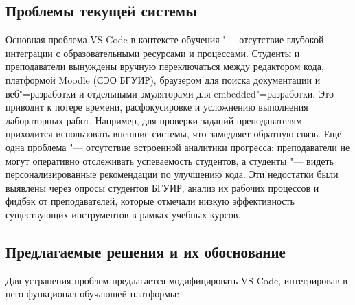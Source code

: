\documentclass{bsuir}
\begin{document}
\subsection{Проблемы текущей системы}

Основная проблема VS Code в контексте обучения "--- отсутствие глубокой
интеграции с образовательными ресурсами и процессами. Студенты и преподаватели
вынуждены вручную переключаться между редактором кода, платформой Moodle (СЭО
БГУИР), браузером для поиска документации и веб"=разработки и отдельными
эмуляторами для embedded"=разработки. Это приводит к потере времени,
расфокусировке и усложнению выполнения лабораторных работ. Например, для
проверки заданий преподавателям приходится использовать внешние системы, что
замедляет обратную связь. Ещё одна проблема "--- отсутствие встроенной аналитики
прогресса: преподаватели не могут оперативно отслеживать успеваемость студентов,
а студенты "--- видеть персонализированные рекомендации по улучшению кода. Эти
недостатки были выявлены через опросы студентов БГУИР, анализ их рабочих
процессов и фидбэк от преподавателей, которые отмечали низкую эффективность
существующих инструментов в рамках учебных курсов.

\subsection{Предлагаемые решения и их обоснование}

Для устранения проблем предлагается модифицировать VS Code, интегрировав в него
функционал обучающей платформы:
\end{document}
